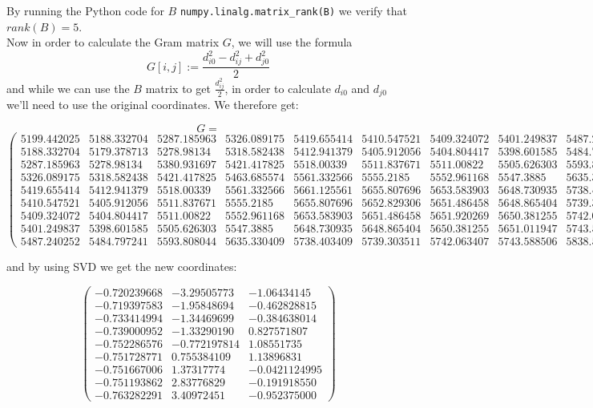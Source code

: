 \documentclass[a4paper,11pt]{article}
\begin{document}
By running the Python code for $B$ \verb|numpy.linalg.matrix_rank(B)| we verify that $rank(B) = 5$.\\
Now in order to calculate the Gram matrix $G$, we will use the formula
\[
  G[i,j] := \frac{d_{i0}^2 - d_{ij}^2 + d_{j0}^2}{2}
\]
and while we can use the $B$ matrix to get $\frac{d_{ij}^2}{2}$, in order to calculate $d_{i0}$ and $d_{j0}$ we'll need to use the original coordinates. We therefore get:
\begin{footnotesize}
  \[G =\]
  \[
    \begin{pmatrix}
      5199.442025 & 5188.332704 & 5287.185963 & 5326.089175 & 5419.655414 & 5410.547521 & 5409.324072 & 5401.249837 & 5487.240252\\
      5188.332704 & 5179.378713 & 5278.98134 & 5318.582438 & 5412.941379 & 5405.912056 & 5404.804417 & 5398.601585 & 5484.797241\\
      5287.185963 & 5278.98134 & 5380.931697 & 5421.417825 & 5518.00339 & 5511.837671 & 5511.00822 & 5505.626303 & 5593.808044\\
      5326.089175 & 5318.582438 & 5421.417825 & 5463.685574 & 5561.332566 & 5555.2185 & 5552.961168 & 5547.3885 & 5635.330409\\
      5419.655414 & 5412.941379 & 5518.00339 & 5561.332566 & 5661.125561 & 5655.807696 & 5653.583903 & 5648.730935 & 5738.403409\\
      5410.547521 & 5405.912056 & 5511.837671 & 5555.2185 & 5655.807696 & 5652.829306 & 5651.486458 & 5648.865404 & 5739.303511\\
      5409.324072 & 5404.804417 & 5511.00822 & 5552.961168 & 5653.583903 & 5651.486458 & 5651.920269 & 5650.381255 & 5742.063407\\
      5401.249837 & 5398.601585 & 5505.626303 & 5547.3885 & 5648.730935 & 5648.865404 & 5650.381255 & 5651.011947 & 5743.588506\\
      5487.240252 & 5484.797241 & 5593.808044 & 5635.330409 & 5738.403409 & 5739.303511 & 5742.063407 & 5743.588506 & 5838.531794
    \end{pmatrix}
  \]
\end{footnotesize}

and by using SVD we get the new coordinates:
\begin{center}
  \[
    \begin{pmatrix}
      -0.720239668 & -3.29505773 & -1.06434145\\
      -0.719397583 & -1.95848694 & -0.462828815\\
      -0.733414994 & -1.34469699 & -0.384638014\\
      -0.739000952 & -1.33290190 & 0.827571807\\
      -0.752286576 & -0.772197814 & 1.08551735\\
      -0.751728771 & 0.755384109 & 1.13896831\\
      -0.751667006 & 1.37317774 & -0.0421124995\\
      -0.751193862 & 2.83776829 & -0.191918550\\
      -0.763282291 & 3.40972451 & -0.952375000
    \end{pmatrix}
  \]
\end{center}
\end{document}
